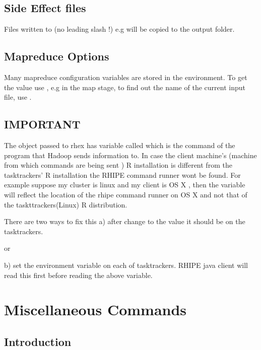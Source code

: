 \documentclass[letterpaper,10pt,english]{manual}
\begin{document}
\section{Side Effect files}

Files written to  (no leading slash !) e.g  will be copied to the output folder.


\section{Mapreduce Options}

Many mapreduce configuration variables are stored in the environment. To get the value use , e.g in the map stage, to find out the name of the current input file, use  .


\section{IMPORTANT}

The object passed to rhex has variable called  which is the
command of the program that Hadoop sends information to. In case the client
machine's (machine from which commands are being sent ) R installation is different from the
tasktrackers' R installation the RHIPE command runner wont be found. For example
suppose my cluster is linux and my client is OS X , then the 
variable will reflect the location of the rhipe command runner on OS X and not
that of the taskttrackers(Linux) R distribution.

There are two ways to fix this
a) after  change  to the
value it should be on the tasktrackers.

or

b) set the environment variable  on each of tasktrackers. RHIPE
java client will read this first before reading the above variable.

\resetcurrentobjects
\hypertarget{--doc-rhmisc}{}

\chapter{Miscellaneous Commands}


\section{Introduction}
\end{document}

